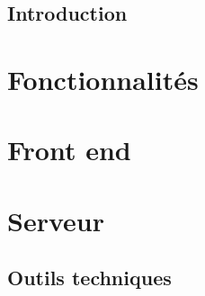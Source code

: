 

\subsection{Introduction}


\section*{Fonctionnalités}
\subsection{}






\section*{Front end}
\subsection{}


\section*{Serveur}


\subsection{Outils techniques}


